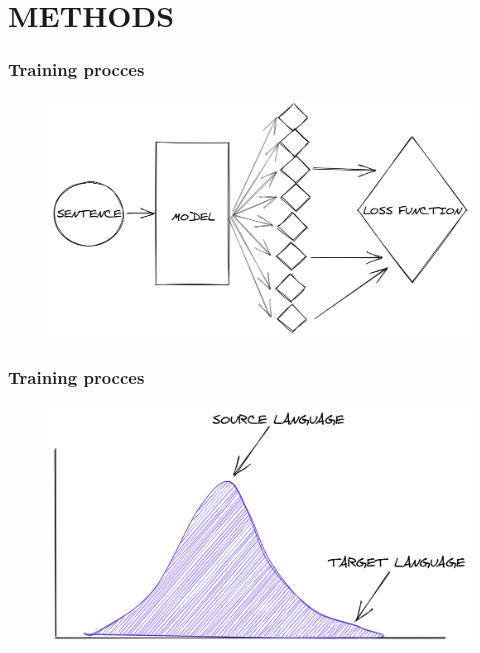 \documentclass{beamer}
\begin{document}

\section{METHODS}

\begin{frame}
\frametitle{Training procces}
\begin{figure}
	\includegraphics[width=0.9\linewidth]{images/4.png}
\end{figure}
\end{frame}


\begin{frame}
\frametitle{Training procces}
\begin{figure}
	\includegraphics[width=0.9\linewidth]{images/7.png}
\end{figure}
\end{frame}

\end{document}
